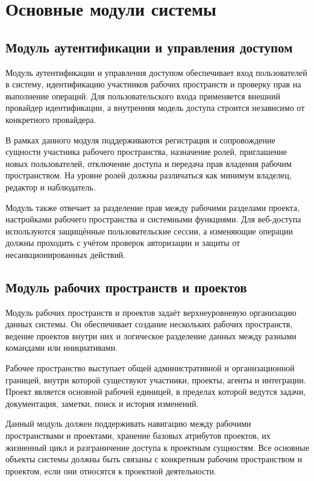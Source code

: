 \section{Основные модули системы}

\subsection{Модуль аутентификации и управления доступом}

\headingtextsep

Модуль аутентификации и управления доступом обеспечивает вход пользователей в систему, идентификацию участников рабочих пространств и проверку прав на выполнение операций. Для пользовательского входа применяется внешний провайдер идентификации, а внутренняя модель доступа строится независимо от конкретного провайдера.

В рамках данного модуля поддерживаются регистрация и сопровождение сущности участника рабочего пространства, назначение ролей, приглашение новых пользователей, отключение доступа и передача прав владения рабочим пространством. На уровне ролей должны различаться как минимум владелец, редактор и наблюдатель.

Модуль также отвечает за разделение прав между рабочими разделами проекта, настройками рабочего пространства и системными функциями. Для веб-доступа используются защищённые пользовательские сессии, а изменяющие операции должны проходить с учётом проверок авторизации и защиты от несанкционированных действий.

\textheadingsep
\subsection{Модуль рабочих пространств и проектов}

\headingtextsep

Модуль рабочих пространств и проектов задаёт верхнеуровневую организацию данных системы. Он обеспечивает создание нескольких рабочих пространств, ведение проектов внутри них и логическое разделение данных между разными командами или инициативами.

Рабочее пространство выступает общей административной и организационной границей, внутри которой существуют участники, проекты, агенты и интеграции. Проект является основной рабочей единицей, в пределах которой ведутся задачи, документация, заметки, поиск и история изменений.

Данный модуль должен поддерживать навигацию между рабочими пространствами и проектами, хранение базовых атрибутов проектов, их жизненный цикл и разграничение доступа к проектным сущностям. Все основные объекты системы должны быть связаны с конкретным рабочим пространством и проектом, если они относятся к проектной деятельности.


